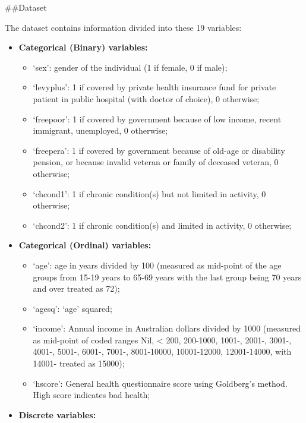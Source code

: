 \documentclass[
]{article}
\providecommand{\tightlist}{%
  \setlength{\itemsep}{0pt}\setlength{\parskip}{0pt}}
\begin{document}
\#\#Dataset

The dataset contains information divided into these 19 variables:

\begin{itemize}
\tightlist
\item
  \textbf{Categorical (Binary) variables:}

  \begin{itemize}
  \tightlist
  \item
    `sex': gender of the individual (1 if female, 0 if male);
  \item
    `levyplus': 1 if covered by private health insurance fund for
    private patient in public hospital (with doctor of choice), 0
    otherwise;
  \item
    `freepoor': 1 if covered by government because of low income, recent
    immigrant, unemployed, 0 otherwise;
  \item
    `freepera': 1 if covered by government because of old-age or
    disability pension, or because invalid veteran or family of deceased
    veteran, 0 otherwise;
  \item
    `chcond1': 1 if chronic condition(s) but not limited in activity, 0
    otherwise;
  \item
    `chcond2': 1 if chronic condition(s) and limited in activity, 0
    otherwise;
  \end{itemize}
\item
  \textbf{Categorical (Ordinal) variables:}

  \begin{itemize}
  \tightlist
  \item
    `age': age in years divided by 100 (measured as mid-point of the age
    groups from 15-19 years to 65-69 years with the last group being 70
    years and over treated as 72);
  \item
    `agesq': `age' squared;
  \item
    `income': Annual income in Australian dollars divided by 1000
    (measured as mid-point of coded ranges Nil, \textless{} 200,
    200-1000, 1001-, 2001-, 3001-, 4001-, 5001-, 6001-, 7001-,
    8001-10000, 10001-12000, 12001-14000, with 14001- treated as 15000);
  \item
    `hscore': General health questionnaire score using Goldberg's
    method. High score indicates bad health;
  \end{itemize}
\item
  \textbf{Discrete variables:}


\end{itemize}
\end{document}
